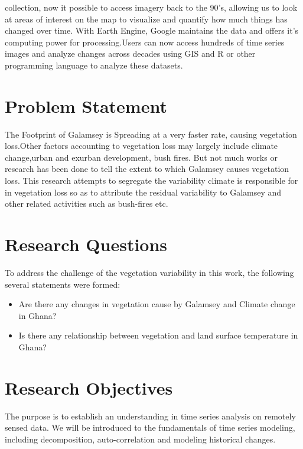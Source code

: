 collection, now it possible to access imagery back to the 90's, allowing us to look at areas of interest on the map to visualize and quantify how much things has changed over time. With Earth Engine, Google maintains the data and offers it's computing power for processing.Users can now access hundreds of time series images and analyze changes across decades using GIS and R or other programming language to analyze these datasets.

\section{Problem Statement}

The Footprint of Galamsey is Spreading at a very faster rate, causing vegetation loss.Other factors accounting to vegetation loss may largely include climate change,urban and exurban development, bush fires. But not much works or research has been done to tell the extent to which Galamsey causes vegetation loss. This research attempts to segregate the variability climate is responsible for in vegetation loss so as to attribute the residual variability to Galamsey and other related activities such as bush-fires etc.

\section{Research Questions}

To address the challenge of the vegetation variability in this work, the following several statements were formed:

\begin{itemize}
	\item  Are there any changes in vegetation cause by Galamsey and Climate change in Ghana?
	
	\item Is there any relationship between vegetation and land surface temperature in Ghana?
\end{itemize}

\section{Research Objectives}

The purpose is to establish an understanding in time series analysis on remotely sensed data. We will be introduced to the fundamentals of time series modeling, including decomposition, auto-correlation and modeling historical changes.

